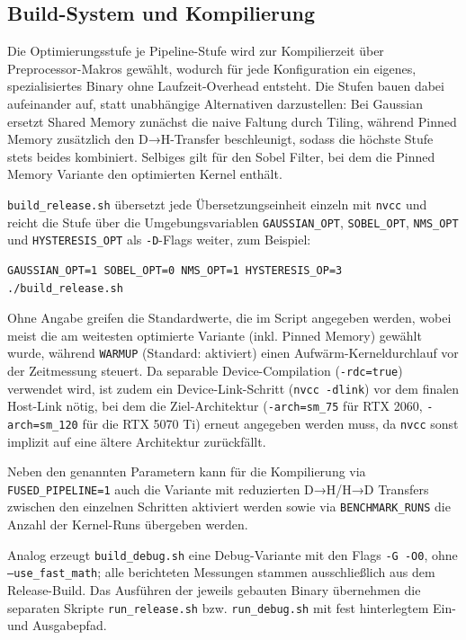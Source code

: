 \subsection{Build-System und Kompilierung}
\label{subsec:build-system-und-kompilierung}

Die Optimierungsstufe je Pipeline-Stufe wird zur Kompilierzeit über
Preprocessor-Makros gewählt, wodurch für jede Konfiguration ein eigenes,
spezialisiertes Binary ohne Laufzeit-Overhead entsteht. Die Stufen
bauen dabei aufeinander auf, statt unabhängige Alternativen
darzustellen: Bei Gaussian ersetzt Shared Memory zunächst die naive
Faltung durch Tiling, während Pinned Memory zusätzlich den
D→H-Transfer beschleunigt, sodass die höchste Stufe stets beides
kombiniert. Selbiges gilt für den Sobel Filter, bei dem die Pinned Memory Variante den optimierten Kernel enthält.

\texttt{build\_release.sh} übersetzt jede Übersetzungseinheit einzeln
mit \texttt{nvcc} und reicht die Stufe über die Umgebungsvariablen
\texttt{GAUSSIAN\_OPT}, \texttt{SOBEL\_OPT}, \texttt{NMS\_OPT} und \texttt{HYSTERESIS\_OPT} als
\texttt{-D}-Flags weiter, zum Beispiel:

\begin{verbatim}
GAUSSIAN_OPT=1 SOBEL_OPT=0 NMS_OPT=1 HYSTERESIS_OP=3 ./build_release.sh
\end{verbatim}

Ohne Angabe greifen die Standardwerte, die im Script angegeben werden, wobei meist die am weitesten
optimierte Variante (inkl. Pinned Memory) gewählt wurde, während \texttt{WARMUP} (Standard: aktiviert)
einen Aufwärm-Kerneldurchlauf vor der Zeitmessung steuert. Da separable
Device-Compilation (\texttt{-rdc=true}) verwendet wird, ist zudem ein
Device-Link-Schritt (\texttt{nvcc~-dlink}) vor dem finalen Host-Link
nötig, bei dem die Ziel-Architektur (\texttt{-arch=sm\_75} für RTX 2060, \texttt{-arch=sm\_120} für die RTX 5070 Ti) erneut
angegeben werden muss, da \texttt{nvcc} sonst implizit auf eine ältere
Architektur zurückfällt.

Neben den genannten Parametern kann für die Kompilierung via \texttt{FUSED\_PIPELINE=1} auch die Variante mit reduzierten D→H/H→D Transfers zwischen den einzelnen Schritten aktiviert werden sowie via \texttt{BENCHMARK\_RUNS} die Anzahl der Kernel-Runs übergeben werden.

\begin{sloppypar}
    Analog erzeugt \texttt{build\_debug.sh} eine Debug-Variante mit den
    Flags \texttt{-G~-O0}, ohne \texttt{--use\_fast\_math}; alle
    berichteten Messungen stammen ausschließlich aus dem Release-Build.
    Das Ausführen der jeweils gebauten Binary übernehmen die separaten
    Skripte \texttt{run\_release.sh} bzw. \texttt{run\_debug.sh} mit fest
    hinterlegtem Ein- und Ausgabepfad.
\end{sloppypar}